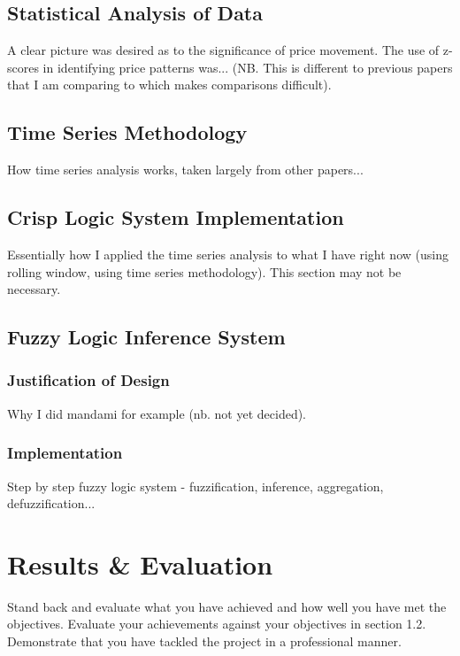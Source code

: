 \documentclass{article}
\begin{document}
\subsection{Statistical Analysis of Data}

A clear picture was desired as to the significance of price movement. The use of z-scores in identifying price patterns was... (NB. This is different to previous papers that I am comparing to which makes comparisons difficult).

\subsection{Time Series Methodology}

How time series analysis works, taken largely from other papers...

\subsection{Crisp Logic System Implementation}

Essentially how I applied the time series analysis to what I have right now (using rolling window, using time series methodology). This section may not be necessary.

\subsection{Fuzzy Logic Inference System}

\subsubsection{Justification of Design}

Why I did mandami for example (nb. not yet decided).

\subsubsection{Implementation}

Step by step fuzzy logic system - fuzzification, inference, aggregation, defuzzification...

\section{Results \& Evaluation}
Stand back and evaluate what you have achieved and how well you have met the objectives. Evaluate your achievements against your objectives in section 1.2. Demonstrate that you have tackled the project in a professional manner. 
\end{document}
